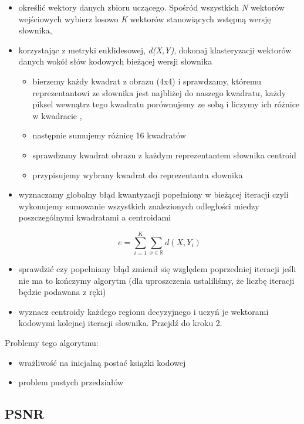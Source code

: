 \documentclass{article}
\begin{document}
\begin{itemize} 
\item określić wektory danych zbioru uczącego. Spośród wszystkich \textit{N} wektorów wejściowych wybierz losowo \textit{K} wektorów stanowiących wstępną wersję słownika,
\item korzystając z metryki euklidesowej, \textit{d(X,Y)}, dokonaj klasteryzacji wektorów danych wokół słów kodowych bieżącej wersji słownika
     \begin{itemize}[label=$\star$]
        \item bierzemy każdy kwadrat z obrazu (4x4) i sprawdzamy, któremu reprezentantowi ze słownika jest najbliżej do naszego kwadratu, każdy piksel wewnątrz tego kwadratu porównujemy ze sobą i liczymy ich różnice w kwadracie ,
        \item następnie sumujemy różnicę 16 kwadratów
        \item sprawdzamy kwadrat obrazu z każdym reprezentantem słownika centroid
        \item przypisujemy wybrany kwadrat do reprezentanta słownika
     \end{itemize}
\item wyznaczamy globalny błąd kwantyzacji popełniony w bieżącej iteracji czyli wykonujemy sumowanie wszystkich znalezionych odległości miedzy poszczególnymi kwadratami a centroidami 
 
\begin{equation}
e = \sum_{i=1}^K \sum_{x\in\mathbb{R}} d(X, Y_{i}) 
\end{equation}

\item sprawdzić czy popełniany błąd zmienił się względem poprzedniej iteracji jeśli nie ma to kończymy algorytm (dla uproszczenia ustaliliśmy, że liczbę iteracji będzie podawana z ręki)
\item wyznacz centroidy każdego regionu decyzyjnego i uczyń je wektorami kodowymi kolejnej iteracji słownika. Przejdź do kroku 2. 
\end{itemize}
 
Problemy tego algorytmu:

\begin{itemize}
	\item wrażliwość na inicjalną postać książki kodowej 
	\item problem pustych przedziałów 
\end{itemize}

\subsection{PSNR}
\end{document}
